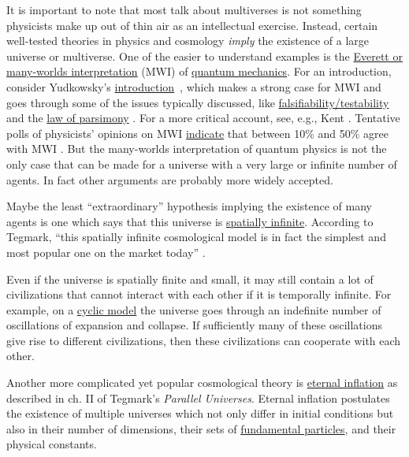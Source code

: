 It is important to note that most talk about multiverses is not
something physicists make up out of thin air as an intellectual
exercise. Instead, certain well-tested theories in physics and cosmology
\emph{imply} the existence of a large universe or multiverse. One of the
easier to understand examples is the
\href{https://en.wikipedia.org/wiki/Many-worlds_interpretation}{Everett
or many-worlds interpretation} (MWI) of
\href{https://en.wikipedia.org/wiki/Quantum_mechanics}{quantum
mechanics}. For an introduction, consider Yudkowsky's
\href{https://wiki.lesswrong.com/wiki/The_Quantum_Physics_Sequence}{introduction}~\citeyear{Yudkowsky2015-tz},
which makes a strong case for MWI and goes through some of the issues typically discussed, like
\href{http://lesswrong.com/lw/q4/decoherence_is_falsifiable_and_testable/}{falsifiability/testability}
and the
\href{http://lesswrong.com/lw/pb/belief_in_the_implied_invisible/}{law
of parsimony}
\parencite{Tegmark2001-lm,Tegmark2007-mx,Vaidman2016-cv}.
For a more critical account, see, e.g., Kent
\citeyear{Kent1997-lm}. Tentative polls of physicists'
opinions on MWI
\href{https://en.wikipedia.org/wiki/Many-worlds_interpretation\#Polls}{indicate}
that between 10\% and 50\% agree with MWI
\parencite{Tipler1994-di,Tegmark1997-dd,Nielsen2004-lu,Emerson2006-go}.
But the many-worlds interpretation of quantum physics is not the only
case that can be made for a universe with a very large or infinite
number of agents. In fact other arguments are probably more widely
accepted.

Maybe the least ``extraordinary'' hypothesis implying the existence of
many agents is one which says that this universe is
\href{https://en.wikipedia.org/wiki/Shape_of_the_universe}{spatially
infinite}. According to Tegmark, ``this spatially infinite
cosmological model is in fact the simplest and most popular one on the
market today'' \citeyear{Tegmark2003-sl}.

Even if the universe is spatially finite and small, it may still contain
a lot of civilizations that cannot interact with each other if it is
temporally infinite. For example, on a
\href{https://en.wikipedia.org/wiki/Cyclic_model}{cyclic model}
the universe goes through an indefinite number of oscillations of
expansion and collapse. If sufficiently many of these oscillations give
rise to different civilizations, then these civilizations can cooperate
with each other.

Another more complicated yet popular cosmological theory is
\href{https://en.wikipedia.org/wiki/Eternal_inflation}{eternal
inflation} as described in ch. II of Tegmark's \emph{Parallel
Universes}. Eternal inflation postulates the existence of multiple
universes which not only differ in initial conditions but also in their
number of dimensions, their sets of
\href{https://en.wikipedia.org/wiki/Elementary_particle}{fundamental
particles}, and their physical constants.


